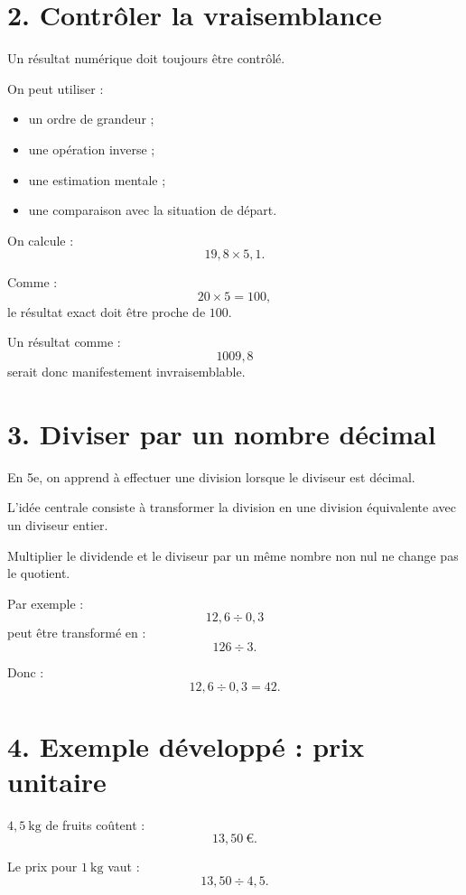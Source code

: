 \section{2. Contrôler la vraisemblance}

Un résultat numérique doit toujours être contrôlé.

On peut utiliser :
\begin{itemize}
\item un ordre de grandeur ;
\item une opération inverse ;
\item une estimation mentale ;
\item une comparaison avec la situation de départ.
\end{itemize}

\begin{exemple}
On calcule :
\[
19{,}8\times5{,}1.
\]

Comme :
\[
20\times5=100,
\]
le résultat exact doit être proche de $100$.

Un résultat comme :
\[
1009{,}8
\]
serait donc manifestement invraisemblable.
\end{exemple}

\section{3. Diviser par un nombre décimal}

En 5e, on apprend à effectuer une division lorsque le diviseur est décimal.

L'idée centrale consiste à transformer la division en une division équivalente avec un diviseur entier.

\begin{propriete}
Multiplier le dividende et le diviseur par un même nombre non nul ne change pas le quotient.
\end{propriete}

Par exemple :
\[
12{,}6\div0{,}3
\]
peut être transformé en :
\[
126\div3.
\]

Donc :
\[
12{,}6\div0{,}3=42.
\]

\section{4. Exemple développé : prix unitaire}

$4{,}5\ \text{kg}$ de fruits coûtent :
\[
13{,}50\ \text{€}.
\]

Le prix pour $1\ \text{kg}$ vaut :
\[
13{,}50\div4{,}5.
\]

